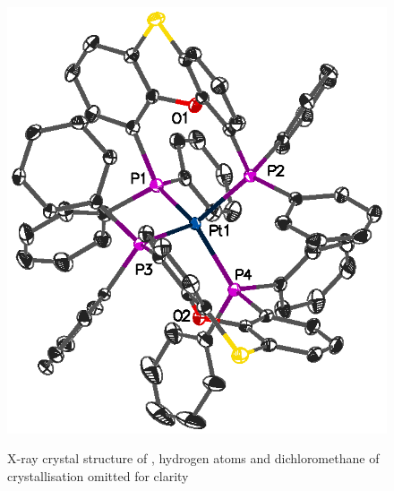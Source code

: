 \begin{figure}[htbp]
\begin{center}
\vspace{0.5cm}
\includegraphics[scale=0.9]{../Figures/CrystalPtSPh2.eps}
\caption[X-ray crystal structure of \ce{[Pt(Ph-thixantphos)2]}]{X-ray crystal structure of \ce{[Pt(Ph-thixantphos)2]}, hydrogen atoms and dichloromethane of crystallisation omitted for clarity}
\vspace{0.2cm}
\label{crystalbisthixantphosplatinum}
\end{center}
\end{figure}
\vspace{0.2cm}

